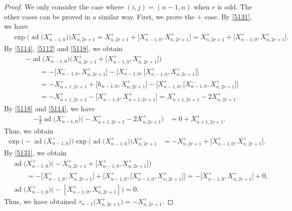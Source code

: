 \documentclass[10pt,a4paper]{amsart}
\numberwithin{equation}{section}
\theoremstyle{definition}
\DeclareMathOperator{\ad}{ad}
\begin{document}
\begin{proof}
We only consider the case where $(i,j)=(n-1,n)$ when $r$ is odd. The other cases can be proved in a similar way. First, we prove the $+$ case. By \eqref{5131}, we have
\begin{align*}
&\exp\bigl(\ad\bigl(X^+_{n-1,0}\bigr)\bigr)X^+_{n,2r+1}=X^+_{n,2r+1}+\bigl[X^+_{n-1,0},X^+_{n,2r+1}\bigr]=X^+_{n,2r+1}+\bigl[X^+_{n-1,0},X^+_{n,2r+1}\bigr].
\end{align*}
By \eqref{5114}, \eqref{5112} and \eqref{5118}, we obtain
\begin{align*}
&-\ad\bigl(X^-_{n-1,0}\bigr)\bigl(X^+_{n,2r+1}+\bigl[X^+_{n-1,0},X^+_{n,2r+1}\bigr]\bigr)\\
&\qquad{}=-\bigl[X^-_{n-1,0},X^+_{n,2r+1}\bigr]-\bigl[X^-_{n-1,0},\bigl[X^+_{n-1,0},X^+_{n,2r+1}\bigr]\bigr]\\
&\qquad{}=-X^+_{n+1,2r+1}+\bigl[h_{n-1,0},X^+_{n,2r+1}\bigr]-\bigl[X^+_{n-1,0},\bigl[X^-_{n-1,0},X^+_{n,2r+1}\bigr]\bigr]\\
&\qquad{}=-X^+_{n+1,2r+1}-\bigl[X^+_{n-1,0},X^+_{n+1,2r+1}\bigr]=X^+_{n+1,2r+1}-2X^+_{n,2r+1}.
\end{align*}
By \eqref{5118} and \eqref{5114}, we have
\begin{align*}
-\frac{1}{2}\ad\bigl(X^-_{n-1,0}\bigr)\bigl(-X^+_{n+1,2r+1}-2X^+_{n,2r+1}\bigr)
&=0+X^+_{n+1,2r+1}.
\end{align*}
Thus, we obtain
\begin{align*}
\exp\bigl(-\ad\bigl(X^-_{n-1,0}\bigr)\bigr)\exp\bigl(\ad\bigl(X^+_{n-1,0}\bigr)\bigr)X^+_{n,2r+1}&=-X^+_{n,2r+1}+\bigl[X^+_{n-1,0},X^+_{n,2r+1}\bigr].
\end{align*}
By \eqref{5131}, we obtain
\begin{align*}
&\ad\bigl(X^+_{n-1,0}\bigr)\bigl(-X^+_{n,2r+1}+\bigl[X^+_{n-1,0},X^+_{n,2r+1}\bigr]\bigr)\\
&\qquad{}=-\bigl[X^+_{n-1,0},X^+_{n,2r+1}\bigr]+\bigl[X^+_{n-1,0},\bigl[X^+_{n-1,0},X^+_{n,2r+1}\bigr]\bigr] =-\bigl[X^+_{n-1,0},X^+_{n,2r+1}\bigr]+0,
\\
& \ad\bigl(X^+_{n-1,0}\bigr)\bigl(-[X^+_{n-1,0},X^+_{n,2r+1}]\bigr)=0.
\end{align*}
Thus, we have obtained $\tau_{n-1}\bigl(X^+_{n,2r+1}\bigr)=-X^+_{n,2r+1}$.


\end{proof}
\end{document}
